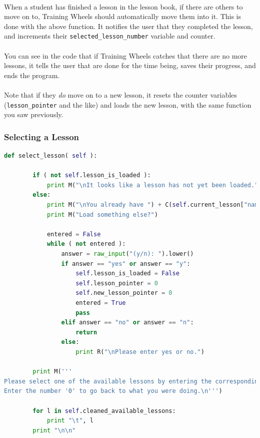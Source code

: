 \documentclass[11pt]{article}
\begin{document}
	\paragraph{} When a student has finished a lesson in the lesson book, if there are others to move on to, Training Wheels should automatically move them into it. This is done with the above function. It notifies the user that they completed the lesson, and increments their \texttt{selected\_lesson\_number} variable and counter.

	\paragraph{} You can see in the code that if Training Wheels catches that there are no more lessons, it tells the user that are done for the time being, saves their progress, and ends the program. 

	\paragraph{} Note that if they \textit{do} move on to a new lesson, it resets the counter variables (\texttt{lesson\_pointer} and the like) and loads the new lesson, with the same function you saw previously.

	\newpage

	\subsubsection{Selecting a Lesson }

\begin{lstlisting}[language=Python]
	def select_lesson( self ):

		if ( not self.lesson_is_loaded ):
			print M("\nIt looks like a lesson has not yet been loaded.")
		else:
			print M("\nYou already have ") + C(self.current_lesson["name"]) + M(" loaded.")
			print M("Load something else?")

			entered = False
			while ( not entered ):
				answer = raw_input("(y/n): ").lower()
				if answer == "yes" or answer == "y":
					self.lesson_is_loaded = False
					self.lesson_pointer = 0
					self.new_lesson_pointer = 0
					entered = True
					pass
				elif answer == "no" or answer == "n":
					return
				else:
					print R("\nPlease enter yes or no.")

		print M('''
Please select one of the available lessons by entering the corresponding number.
Enter the number '0' to go back to what you were doing.\n''')		

		for l in self.cleaned_available_lessons:
			print "\t", l
		print "\n\n"

		
	\end{lstlisting}	
\end{document}
